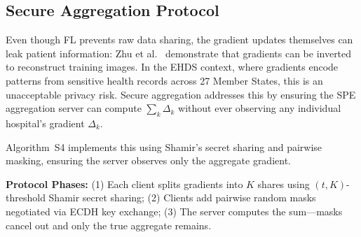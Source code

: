 \documentclass[conference,a4paper]{IEEEtran}
\begin{document}
\subsection{Secure Aggregation Protocol}

Even though FL prevents raw data sharing, the gradient updates themselves can leak patient information: Zhu et al.~\cite{zhu2019deep} demonstrate that gradients can be inverted to reconstruct training images. In the EHDS context, where gradients encode patterns from sensitive health records across 27 Member States, this is an unacceptable privacy risk. Secure aggregation addresses this by ensuring the SPE aggregation server can compute $\sum_k \Delta_k$ without ever observing any individual hospital's gradient $\Delta_k$.

Algorithm~S4 implements this using Shamir's secret sharing and pairwise masking, ensuring the server observes only the aggregate gradient.

\textbf{Protocol Phases:} (1) Each client splits gradients into $K$ shares using $(t,K)$-threshold Shamir secret sharing; (2) Clients add pairwise random masks negotiated via ECDH key exchange; (3) The server computes the sum---masks cancel out and only the true aggregate remains.

\begin{figure}[htbp]
\centering
{}
\end{figure}
\end{document}
